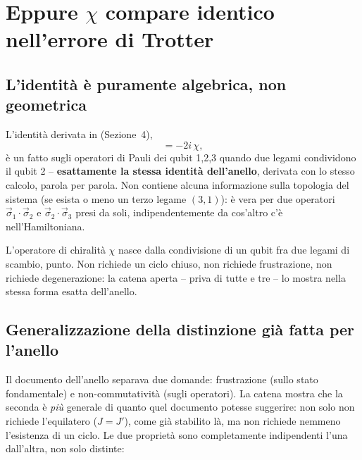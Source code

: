\documentclass[11pt,a4paper]{article}
\begin{document}
\section{Eppure $\chi$ compare identico nell'errore di Trotter}

\subsection{L'identità è puramente algebrica, non geometrica}

L'identità derivata in
\texttt{} (Sezione~4),
\begin{equation}
[\vec\sigma_1\cdot\vec\sigma_2,\,\vec\sigma_2\cdot\vec\sigma_3] = -2i\,\chi,
\end{equation}
è un fatto sugli operatori di Pauli dei qubit 1,2,3 quando due legami
condividono il qubit 2 -- \textbf{esattamente la stessa identità dell'anello},
derivata con lo stesso calcolo, parola per parola. Non contiene alcuna
informazione sulla topologia del sistema (se esista o meno un terzo legame
$(3,1)$): è vera per due operatori $\vec\sigma_1\!\cdot\!\vec\sigma_2$ e
$\vec\sigma_2\!\cdot\!\vec\sigma_3$ presi da soli, indipendentemente da
cos'altro c'è nell'Hamiltoniana.

\begin{keyeq}
\centering
L'operatore di chiralità $\chi$ nasce dalla condivisione di un qubit fra
due legami di scambio, punto. Non richiede un ciclo chiuso, non richiede
frustrazione, non richiede degenerazione: la catena aperta -- priva di
tutte e tre -- lo mostra nella stessa forma esatta dell'anello.
\end{keyeq}

\subsection{Generalizzazione della distinzione già fatta per l'anello}

Il documento dell'anello separava due domande: frustrazione (sullo stato
fondamentale) e non-commutatività (sugli operatori). La catena mostra che
la seconda è \emph{più} generale di quanto quel documento potesse
suggerire: non solo non richiede l'equilatero ($J=J'$), come già stabilito
là, ma non richiede nemmeno l'esistenza di un ciclo. Le due proprietà sono
completamente indipendenti l'una dall'altra, non solo distinte:
\end{document}
